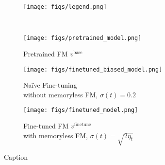 \documentclass[]{fairmeta}
\begin{document}

\begin{figure}
    \centering
    \begin{subfigure}[t]{\linewidth}
        \centering
        \texttt{[image: figs/legend.png]}
    \end{subfigure}\\
    \begin{subfigure}[t]{0.33\linewidth}
        \centering
        \texttt{[image: figs/pretrained\_model.png]}
        \caption{Pretrained FM $v^\mathrm{base}$}
    \end{subfigure}%
    \begin{subfigure}[t]{0.33\linewidth}
        \centering
        \texttt{[image: figs/finetuned\_biased\_model.png]}
        \caption{Na\"ive Fine-tuning\\ without memoryless FM, $\sigma(t) = 0.2$}
    \end{subfigure}%
    \begin{subfigure}[t]{0.33\linewidth}
        \centering
        \texttt{[image: figs/finetuned\_model.png]}
        \caption{Fine-tuned FM $v^\mathrm{finetune}$\\ with memoryless FM, $\sigma(t) = \sqrt{2\eta_t}$}
    \end{subfigure}
    \caption{Caption}
    \label{fig:memorylessness_illustration}
\end{figure}
\end{document}
